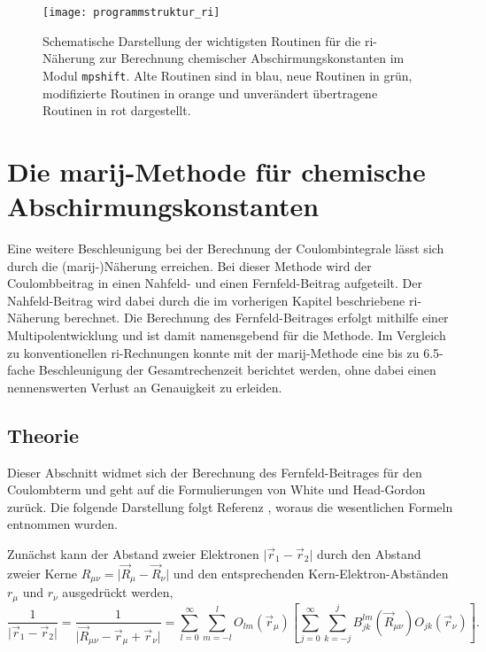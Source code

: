 \begin{figure}[ht!]
\centering
\texttt{[image: programmstruktur\_ri]}
\captionsetup{figurewithin = chapter}
\captionsetup{font=small, labelfont=bf}\caption[\ac{ri}-J-Routinen für chemische Abschirmungskonstanten]{Schematische Darstellung der wichtigsten Routinen für die \ac{ri}-Näherung zur Berechnung chemischer Abschirmungskonstanten im Modul \texttt{mpshift}. Alte Routinen sind in blau, neue Routinen in grün, modifizierte Routinen in orange und unverändert übertragene Routinen in rot dargestellt.}
\label{abb:programmstrukur_ri}
\end{figure}

\section{Die \acs{marij}-Methode für chemische Abschirmungskonstanten}\label{marij}
Eine weitere Beschleunigung bei der Berechnung der Coulombintegrale lässt sich durch die \mbox{(\acs{marij}-)}Näherung erreichen. Bei dieser Methode wird der Coulombbeitrag in einen Nahfeld- und einen Fernfeld-Beitrag aufgeteilt. Der Nahfeld-Beitrag wird dabei durch die im vorherigen Kapitel beschriebene \ac{ri}-Näherung berechnet. Die Berechnung des Fernfeld-Beitrages erfolgt mithilfe einer Multipolentwicklung und ist damit namensgebend für die Methode. Im Vergleich zu konventionellen \ac{ri}-Rechnungen konnte mit der \ac{marij}-Methode eine bis zu 6.5-fache Beschleunigung der Gesamtrechenzeit berichtet werden, ohne dabei einen nennenswerten Verlust an Genauigkeit zu erleiden.\supercite{sierka2003fast}

	\subsection{Theorie}
	Dieser Abschnitt widmet sich der Berechnung des Fernfeld-Beitrages für den Coulombterm und geht auf die Formulierungen von White und Head-Gordon\supercite{white1994derivation} zurück. Die folgende Darstellung folgt Referenz \cite{sierka2003fast}, woraus die wesentlichen Formeln entnommen wurden. 
	
	Zunächst kann der Abstand zweier Elektronen $\vert\vec{r}_1-\vec{r}_2\vert$ durch den Abstand zweier Kerne $R_{\mu\nu}=\vert\vec{R}_\mu-\vec{R}_\nu\vert$ und den entsprechenden Kern-Elektron-Abständen $r_\mu$ und $r_\nu$ ausgedrückt werden,
	\begin{equation}
	\frac{1}{\vert\vec{r}_1-\vec{r}_2\vert}=\frac{1}{\vert\vec{R}_{\mu\nu}-\vec{r}_\mu+\vec{r}_\nu\vert}=\sum_{l=0}^{\infty}\sum_{m=-l}^l O_{lm}(\vec{r}_\mu)\left[\sum_{j=0}^{\infty}\sum_{k=-j}^jB_{jk}^{lm}(\vec{R}_{\mu\nu})O_{jk}(\vec{r}_\nu)\right].
	\end{equation}
	
